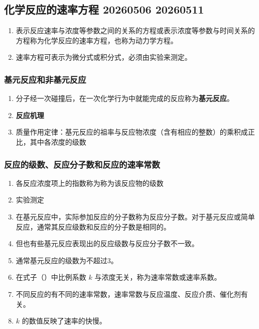\subsection{化学反应的速率方程 20260506 20260511}

\begin{enumerate}
    \item 表示反应速率与浓度等参数之间的关系的方程或表示浓度等参数与时间关系的方程称为化学反应的速率方程，也称为动力学方程。
    \item 速率方程可表示为微分式或积分式，必须由实验来测定。
\end{enumerate}

\subsubsection{基元反应和非基元反应}

\begin{enumerate}   
    \item 分子经一次碰撞后，在一次化学行为中就能完成的反应称为\textbf{基元反应}。
    \item \textbf{反应机理}
    \item 质量作用定律：基元反应的祖率与反应物浓度（含有相应的整数）的乘积成正比，其中各浓度的级数
\end{enumerate}

\subsubsection{反应的级数、反应分子数和反应的速率常数}

\begin{enumerate}
    \item 各反应浓度项上的指数称为称为该反应物的级数
    \item 实验测定
    \item 在基元反应中，实际参加反应的分子数称为反应分子数。对于基元反应或简单反应，通常其反应级数和反应的分子数是相同的。
    \item 但也有些基元反应表现出的反应级数与反应分子数不一致。
    \item 通常基元反应的级数为不超过3。
    \item 在式子（）中比例系数 $k$ 与浓度无关，称为速率常数或速率系数。
    \item 不同反应的有不同的速率常数，速率常数与反应温度、反应介质、催化剂有关。
    \item $k$ 的数值反映了速率的快慢。
\end{enumerate}

